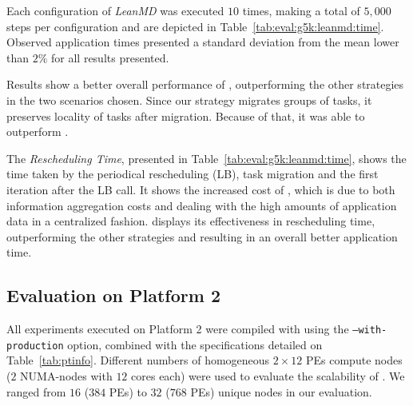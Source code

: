 


Each configuration of \textit{LeanMD} was executed $10$ times, making a total of $5,000$ steps per configuration and are depicted in Table~\ref{tab:eval:g5k:leanmd:time}.
Observed application times presented a standard deviation from the mean lower than $2\%$ for all results presented.

Results show a better overall performance of \packdrop, outperforming the other strategies in the two scenarios chosen.
Since our strategy migrates groups of tasks, it preserves locality of tasks after migration. 
Because of that, it was able to outperform \distributedlb.

The \textit{Rescheduling Time}, presented in Table~\ref{tab:eval:g5k:leanmd:time}, shows the time taken by the periodical rescheduling (LB), task migration and the first iteration after the LB call.
It shows the increased cost of , which is due to both information aggregation costs and dealing with the high amounts of application data in a centralized fashion.
\packdrop displays its effectiveness in rescheduling time, outperforming the other strategies and resulting in an overall better application time. 

\subsection{Evaluation on Platform 2} \label{sec:sdumont}

All experiments executed on Platform 2 were compiled with \charm using the {\small\texttt{--with-production}} option, combined with the specifications detailed on Table~\ref{tab:ptinfo}.
Different numbers of homogeneous $2\times 12$ PEs compute nodes ($2$ NUMA-nodes with $12$ cores each) were used to evaluate the scalability of \packdrop.
We ranged from $16$ ($384$ PEs) to $32$ ($768$ PEs) unique nodes in our evaluation. 

